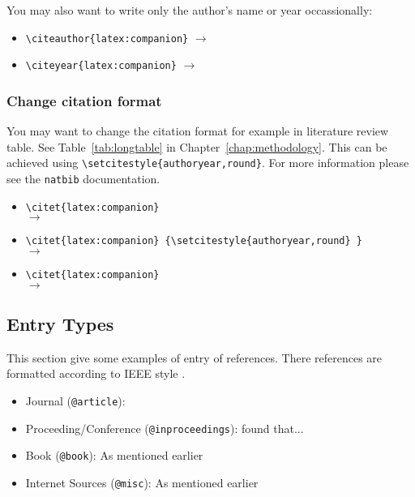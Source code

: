 You may also want to write only the author's name or year occassionally:

\begin{itemize}[nosep]\singlespacing
	\item \verb|\citeauthor{latex:companion}| $\to$ \citeauthor{latex:companion}
	\item \verb|\citeyear{latex:companion}| $\to$ \citeyear{latex:companion}
\end{itemize} 

\subsubsection{Change citation format}

You may want to change the citation format for example in literature review table. See Table~\ref{tab:longtable} in Chapter~\ref{chap:methodology}. This can be achieved using \verb|\setcitestyle{authoryear,round}|. For more information please see the \verb|natbib| documentation. 

\begin{itemize}[nosep]\singlespacing
	\item \verb|\citet{latex:companion}| \\ $\to$ \citet{latex:companion}
	\item {  \verb|\citet{latex:companion} {\setcitestyle{authoryear,round} }| \\ $\to$ \citet{latex:companion} } 
	\item \verb|\citet{latex:companion}| \\ $\to$ \citet{latex:companion}
\end{itemize}

\subsection{Entry Types}

This section give some examples of entry of references. There references are formatted according to IEEE style \citep{ieee}. 

\begin{itemize}[nosep]\singlespacing
	\item Journal (\verb|@article|): \citet{othman2019effect} 
	\item Proceeding/Conference (\verb|@inproceedings|): \citet{wanna2018fracture} found that... 
	\item Book (\verb|@book|): As mentioned earlier \citep{latex:companion} 
	\item Internet Sources (\verb|@misc|): As mentioned earlier \citep{lim:latextypesetting} 
\end{itemize}